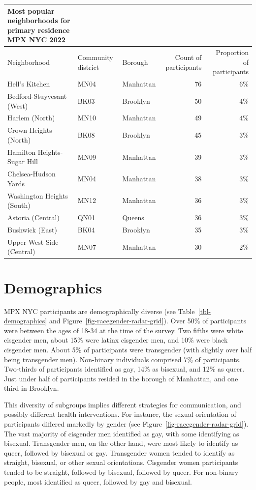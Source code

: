 \documentclass[
  letterpaper,
  DIV=11,
  numbers=noendperiod,
  oneside]{scrreprt}
\begin{document}
\begin{longtable*}{lllrr}
\caption*{
{\large Most popular neighborhoods for primary residence} \\ 
{\small MPX NYC 2022}
} \\ 
\toprule
Neighborhood & Community district & Borough & Count of participants & Proportion of participants \\ 
\midrule\addlinespace[2.5pt]
Hell's Kitchen & MN04 & Manhattan & 76 & $6\%$ \\ 
Bedford-Stuyvesant (West) & BK03 & Brooklyn & 50 & $4\%$ \\ 
Harlem (North) & MN10 & Manhattan & 49 & $4\%$ \\ 
Crown Heights (North) & BK08 & Brooklyn & 45 & $3\%$ \\ 
Hamilton Heights-Sugar Hill & MN09 & Manhattan & 39 & $3\%$ \\ 
Chelsea-Hudson Yards & MN04 & Manhattan & 38 & $3\%$ \\ 
Washington Heights (South) & MN12 & Manhattan & 36 & $3\%$ \\ 
Astoria (Central) & QN01 & Queens & 36 & $3\%$ \\ 
Bushwick (East) & BK04 & Brooklyn & 35 & $3\%$ \\ 
Upper West Side (Central) & MN07 & Manhattan & 30 & $2\%$ \\ 
\bottomrule
\end{longtable*}

\hypertarget{demographics}{%
\section{Demographics}\label{demographics}}

MPX NYC participants are demographically diverse (see
Table~\ref{tbl-demographics} and
Figure~\ref{fig-racegender-radar-grid}). Over 50\% of participants were
between the ages of 18-34 at the time of the survey. Two fifths were
white cisgender men, about 15\% were latinx cisgender men, and 10\% were
black cisgender men. About 5\% of participants were transgender (with
slightly over half being transgender men). Non-binary individuals
comprised 7\% of participants. Two-thirds of participants identified as
gay, 14\% as bisexual, and 12\% as queer. Just under half of
participants resided in the borough of Manhattan, and one third in
Brooklyn.

This diversity of subgroups implies different strategies for
communication, and possibly different health interventions. For
instance, the sexual orientation of participants differed markedly by
gender (see Figure~\ref{fig-racegender-radar-grid}). The vast majority
of cisgender men identified as gay, with some identifying as bisexual.
Transgender men, on the other hand, were most likely to identify as
queer, followed by bisexual or gay. Transgender women tended to identify
as straight, bisexual, or other sexual orientations. Cisgender women
participants tended to be straight, followed by bisexual, followed by
queer. For non-binary people, most identified as queer, followed by gay
and bisexual.
\end{document}
